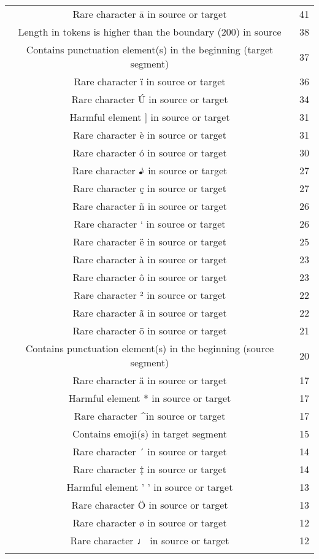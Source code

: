 \begin{longtable}{cc}
Rare character ā in source or target & 41 \\
Length in tokens is higher than the boundary (200) in source & 38 \\
Contains punctuation element(s) in the beginning (target segment) & 37 \\
Rare character ï in source or target & 36 \\
Rare character Ú in source or target & 34 \\
Harmful element ] in source or target & 31 \\
Rare character è in source or target & 31 \\
Rare character ó in source or target & 30 \\
Rare character ♪ in source or target & 27 \\
Rare character ç in source or target & 27 \\
Rare character ñ in source or target & 26 \\
Rare character ` in source or target & 26 \\
Rare character ë in source or target & 25 \\
Rare character à in source or target & 23 \\
Rare character ô in source or target & 23 \\
Rare character ² in source or target & 22 \\
Rare character ã in source or target & 22 \\
Rare character ō in source or target & 21 \\
Contains punctuation element(s) in the beginning (source segment) & 20 \\
Rare character ä in source or target & 17 \\
Harmful element * in source or target & 17 \\
Rare character \textasciicircum in source or target & 17 \\
Contains emoji(s) in target segment & 15 \\ 
Rare character ´ in source or target & 14 \\
Rare character ‡ in source or target & 14 \\
Harmful element ' ' in source or target & 13 \\
Rare character Ö in source or target & 13 \\
Rare character ø in source or target & 12 \\
Rare character ♩ in source or target & 12 \\ \\

\end{longtable}
